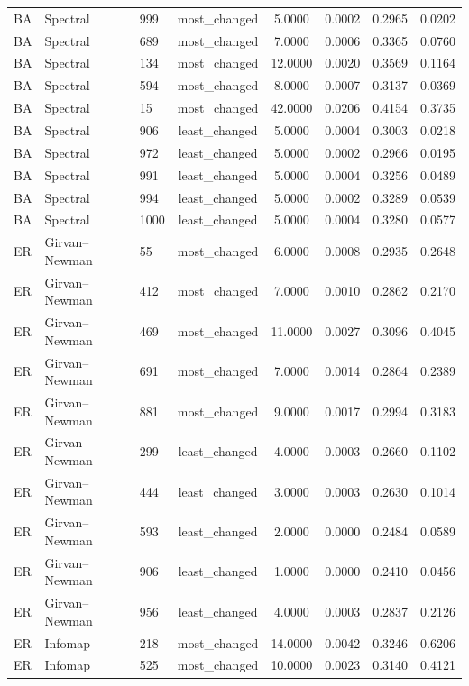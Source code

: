 \begin{longtable}{lllccccc}
BA & Spectral & 999 & most\_changed & 5.0000 & 0.0002 & 0.2965 & 0.0202 \\
BA & Spectral & 689 & most\_changed & 7.0000 & 0.0006 & 0.3365 & 0.0760 \\
BA & Spectral & 134 & most\_changed & 12.0000 & 0.0020 & 0.3569 & 0.1164 \\
BA & Spectral & 594 & most\_changed & 8.0000 & 0.0007 & 0.3137 & 0.0369 \\
BA & Spectral & 15 & most\_changed & 42.0000 & 0.0206 & 0.4154 & 0.3735 \\
BA & Spectral & 906 & least\_changed & 5.0000 & 0.0004 & 0.3003 & 0.0218 \\
BA & Spectral & 972 & least\_changed & 5.0000 & 0.0002 & 0.2966 & 0.0195 \\
BA & Spectral & 991 & least\_changed & 5.0000 & 0.0004 & 0.3256 & 0.0489 \\
BA & Spectral & 994 & least\_changed & 5.0000 & 0.0002 & 0.3289 & 0.0539 \\
BA & Spectral & 1000 & least\_changed & 5.0000 & 0.0004 & 0.3280 & 0.0577 \\
ER & Girvan--Newman & 55 & most\_changed & 6.0000 & 0.0008 & 0.2935 & 0.2648 \\
ER & Girvan--Newman & 412 & most\_changed & 7.0000 & 0.0010 & 0.2862 & 0.2170 \\
ER & Girvan--Newman & 469 & most\_changed & 11.0000 & 0.0027 & 0.3096 & 0.4045 \\
ER & Girvan--Newman & 691 & most\_changed & 7.0000 & 0.0014 & 0.2864 & 0.2389 \\
ER & Girvan--Newman & 881 & most\_changed & 9.0000 & 0.0017 & 0.2994 & 0.3183 \\
ER & Girvan--Newman & 299 & least\_changed & 4.0000 & 0.0003 & 0.2660 & 0.1102 \\
ER & Girvan--Newman & 444 & least\_changed & 3.0000 & 0.0003 & 0.2630 & 0.1014 \\
ER & Girvan--Newman & 593 & least\_changed & 2.0000 & 0.0000 & 0.2484 & 0.0589 \\
ER & Girvan--Newman & 906 & least\_changed & 1.0000 & 0.0000 & 0.2410 & 0.0456 \\
ER & Girvan--Newman & 956 & least\_changed & 4.0000 & 0.0003 & 0.2837 & 0.2126 \\
ER & Infomap & 218 & most\_changed & 14.0000 & 0.0042 & 0.3246 & 0.6206 \\
ER & Infomap & 525 & most\_changed & 10.0000 & 0.0023 & 0.3140 & 0.4121 \\

\end{longtable}
